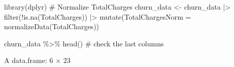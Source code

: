 \documentclass[
  letterpaper,
  DIV=11,
  numbers=noendperiod]{scrreprt}
\newenvironment{Shaded}{\begin{snugshade}}{\end{snugshade}}
\newcommand{\AttributeTok}[1]{\textcolor[rgb]{0.40,0.45,0.13}{#1}}
\newcommand{\CommentTok}[1]{\textcolor[rgb]{0.37,0.37,0.37}{#1}}
\newcommand{\FunctionTok}[1]{\textcolor[rgb]{0.28,0.35,0.67}{#1}}
\newcommand{\NormalTok}[1]{\textcolor[rgb]{0.00,0.23,0.31}{#1}}
\newcommand{\OtherTok}[1]{\textcolor[rgb]{0.00,0.23,0.31}{#1}}
\newcommand{\SpecialCharTok}[1]{\textcolor[rgb]{0.37,0.37,0.37}{#1}}
\begin{document}
\begin{Shaded}
\begin{Highlighting}[]
\FunctionTok{library}\NormalTok{(dplyr)}
\CommentTok{\# Normalize TotalCharges}
\NormalTok{churn\_data }\OtherTok{\textless{}{-}}\NormalTok{ churn\_data }\SpecialCharTok{|\textgreater{}}
    \FunctionTok{filter}\NormalTok{(}\SpecialCharTok{!}\FunctionTok{is.na}\NormalTok{(TotalCharges)) }\SpecialCharTok{|\textgreater{}}
    \FunctionTok{mutate}\NormalTok{(}\AttributeTok{TotalChargesNorm =} \FunctionTok{normalizeData}\NormalTok{(TotalCharges))}

\NormalTok{churn\_data }\SpecialCharTok{\%\textgreater{}\%} \FunctionTok{head}\NormalTok{() }\CommentTok{\# check the last columns}
\end{Highlighting}
\end{Shaded}

A data.frame: 6 × 23
\end{document}

